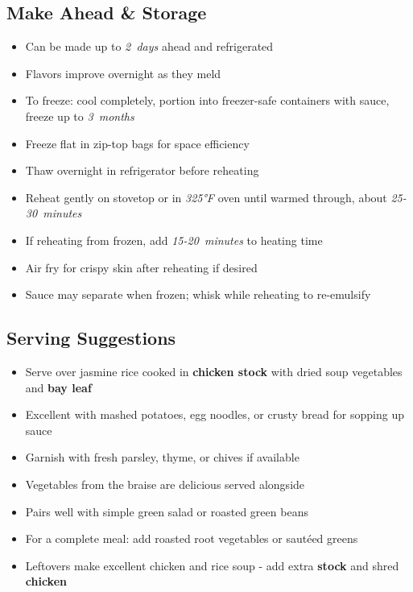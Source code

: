 \documentclass[11pt,letterpaper]{article}
\begin{document}
{\begin{multicols}{2}
\subsection*{Make Ahead \& Storage}
\begin{itemize}
    \item Can be made up to \textit{2~days} ahead and refrigerated
    \item Flavors improve overnight as they meld
    \item To freeze: cool completely, portion into freezer-safe containers with sauce, freeze up to \textit{3~months}
    \item Freeze flat in zip-top bags for space efficiency
    \item Thaw overnight in refrigerator before reheating
    \item Reheat gently on stovetop or in \textit{325°F} oven until warmed through, about \textit{25-30~minutes}
    \item If reheating from frozen, add \textit{15-20~minutes} to heating time
    \item Air fry for crispy skin after reheating if desired
    \item Sauce may separate when frozen; whisk while reheating to re-emulsify
\end{itemize}

\subsection*{Serving Suggestions}
\begin{itemize}
    \item Serve over jasmine rice cooked in \textbf{chicken stock} with dried soup vegetables and \textbf{bay leaf}
    \item Excellent with mashed potatoes, egg noodles, or crusty bread for sopping up sauce
    \item Garnish with fresh parsley, thyme, or chives if available
    \item Vegetables from the braise are delicious served alongside
    \item Pairs well with simple green salad or roasted green beans
    \item For a complete meal: add roasted root vegetables or sautéed greens
    \item Leftovers make excellent chicken and rice soup - add extra \textbf{stock} and shred \textbf{chicken}
\end{itemize}

\end{multicols}
}
\end{document}

